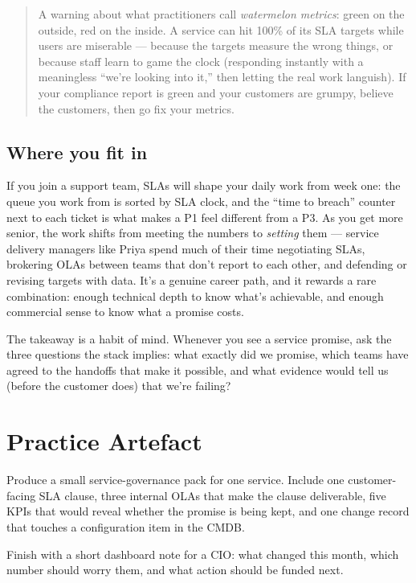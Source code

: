 \begin{quote}\small
A warning about what practitioners call \emph{watermelon metrics}: green on the outside, red on the inside. A service can hit 100\% of its SLA targets while users are miserable — because the targets measure the wrong things, or because staff learn to game the clock (responding instantly with a meaningless ``we're looking into it,'' then letting the real work languish). If your compliance report is green and your customers are grumpy, believe the customers, then go fix your metrics.
\end{quote}



\subsection{Where you fit in}


If you join a support team, SLAs will shape your daily work from week one: the queue you work from is sorted by SLA clock, and the ``time to breach'' counter next to each ticket is what makes a P1 feel different from a P3. As you get more senior, the work shifts from meeting the numbers to \emph{setting} them — service delivery managers like Priya spend much of their time negotiating SLAs, brokering OLAs between teams that don't report to each other, and defending or revising targets with data. It's a genuine career path, and it rewards a rare combination: enough technical depth to know what's achievable, and enough commercial sense to know what a promise costs.


The takeaway is a habit of mind. Whenever you see a service promise, ask the three questions the stack implies: what exactly did we promise, which teams have agreed to the handoffs that make it possible, and what evidence would tell us (before the customer does) that we're failing?

\section{Practice Artefact}

Produce a small service-governance pack for one service. Include one customer-facing SLA clause, three internal OLAs that make the clause deliverable, five KPIs that would reveal whether the promise is being kept, and one change record that touches a configuration item in the CMDB.


Finish with a short dashboard note for a CIO: what changed this month, which number should worry them, and what action should be funded next.
